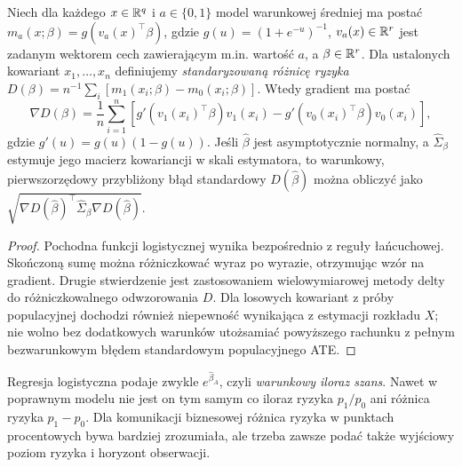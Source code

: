 \begin{stwierdzenie}\label{prop:logit-std}
Niech dla każdego $x\in\mathbb R^q$ i $a\in\{0,1\}$ model warunkowej średniej ma postać $m_a(x;\beta)=g(v_a(x)^\top\beta)$, gdzie $g(u)=(1+e^{-u})^{-1}$, $v_a(x)\in\mathbb R^r$ jest zadanym wektorem cech zawierającym m.in. wartość $a$, a $\beta\in\mathbb R^r$. Dla ustalonych kowariant $x_1,\ldots,x_n$ definiujemy \emph{standaryzowaną różnicę ryzyka}
$D(\beta)=n^{-1}\sum_i[m_1(x_i;\beta)-m_0(x_i;\beta)]$.
Wtedy gradient ma postać
\[
\nabla D(\beta)=\frac1n\sum_{i=1}^n\left[g'(v_1(x_i)^\top\beta)v_1(x_i)-g'(v_0(x_i)^\top\beta)v_0(x_i)\right],
\]
gdzie $g'(u)=g(u)(1-g(u))$. Jeśli $\widehat\beta$ jest asymptotycznie normalny, a $\widehat\Sigma_\beta$ estymuje jego macierz kowariancji w skali estymatora, to warunkowy, pierwszorzędowy przybliżony błąd standardowy $D(\widehat\beta)$ można obliczyć jako $\sqrt{\nabla D(\widehat\beta)^\top\widehat\Sigma_\beta\nabla D(\widehat\beta)}$.
\end{stwierdzenie}
\begin{proof}
Pochodna funkcji logistycznej wynika bezpośrednio z reguły łańcuchowej. Skończoną sumę można różniczkować wyraz po wyrazie, otrzymując wzór na gradient. Drugie stwierdzenie jest zastosowaniem wielowymiarowej metody delty do różniczkowalnego odwzorowania $D$. Dla losowych kowariant z próby populacyjnej dochodzi również niepewność wynikająca z estymacji rozkładu $X$; nie wolno bez dodatkowych warunków utożsamiać powyższego rachunku z pełnym bezwarunkowym błędem standardowym populacyjnego ATE.
\end{proof}

\begin{uwaga}
Regresja logistyczna podaje zwykle $e^{\widehat\beta_A}$, czyli \emph{warunkowy iloraz szans}. Nawet w poprawnym modelu nie jest on tym samym co iloraz ryzyka $p_1/p_0$ ani różnica ryzyka $p_1-p_0$. Dla komunikacji biznesowej różnica ryzyka w punktach procentowych bywa bardziej zrozumiała, ale trzeba zawsze podać także wyjściowy poziom ryzyka i horyzont obserwacji.
\end{uwaga}

